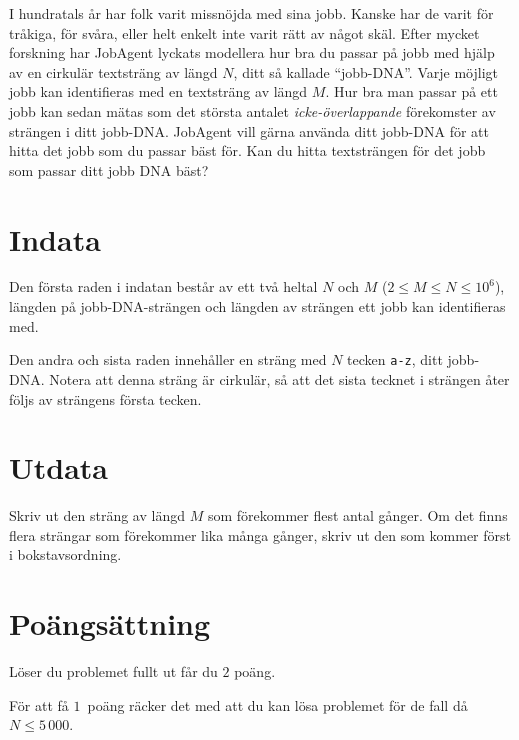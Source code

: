 I hundratals år har folk varit missnöjda med sina jobb.
Kanske har de varit för tråkiga, för svåra, eller helt enkelt inte varit rätt av något skäl.
Efter mycket forskning har JobAgent lyckats modellera hur bra du passar på jobb med hjälp av en cirkulär textsträng av längd $N$, ditt så kallade ``jobb-DNA''.
Varje möjligt jobb kan identifieras med en textsträng av längd $M$.
Hur bra man passar på ett jobb kan sedan mätas som det största antalet \emph{icke-överlappande} förekomster av strängen i ditt jobb-DNA.
JobAgent vill gärna använda ditt jobb-DNA för att hitta det jobb som du passar bäst för.
Kan du hitta textsträngen för det jobb som passar ditt jobb DNA bäst?

\section*{Indata}
Den första raden i indatan består av ett två heltal $N$ och $M$ ($2 \le M \le N \le 10^6$), längden på jobb-DNA-strängen och längden av strängen ett jobb kan identifieras med.

Den andra och sista raden innehåller en sträng med $N$ tecken \texttt{a-z}, ditt jobb-DNA.
Notera att denna sträng är cirkulär, så att det sista tecknet i strängen åter följs av strängens första tecken.

\section*{Utdata}
Skriv ut den sträng av längd $M$ som förekommer flest antal gånger.
Om det finns flera strängar som förekommer lika många gånger, skriv ut den som kommer först i bokstavsordning.

\section*{Poängsättning}
Löser du problemet fullt ut får du $2$ poäng.

För att få $1$ poäng räcker det med att du kan lösa problemet för de fall då $N \le 5\,000$.
